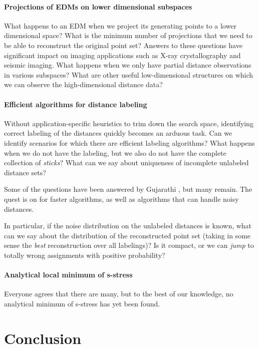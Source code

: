 \documentclass[10pt,double]{IEEEtran}
\newcommand{\rev}[1]{{#1}}
\begin{document}
\paragraph{Projections of EDMs on lower dimensional subspaces} What happens
to an EDM when we project its generating points to a lower dimensional space?
What is the minimum number of projections that we need to be able to
reconstruct the original point set? Answers to these questions have
significant impact on imaging applications such as X-ray crystallography and
seismic imaging. What happens when we only have partial distance observations
in various subspaces? What are other useful low-dimensional structures on
which we can observe the high-dimensional distance data?


\paragraph{Efficient algorithms for distance labeling} Without
application-specific heuristics to trim down the search space, identifying
correct labeling of the distances quickly becomes an arduous task. Can we
identify scenarios for which there are efficient labeling algorithms? What
happens when we do not have the labeling, but we also do not have the complete
collection of \emph{sticks}? What can we say about uniqueness of incomplete
unlabeled distance sets? \rev{Some of the questions have been answered by
Gujarathi \cite{Gujarathi:2014cz}, but many remain. The quest is on for faster
algorithms, as well as algorithms that can handle noisy distances.

In particular, if the noise distribution on the unlabeled distances is known,
what can we say about the distribution of the reconstructed point set (taking
in some sense the \emph{best} reconstruction over all labelings)? Is it
compact, or we can \emph{jump} to totally wrong assignments with positive
probability?}


\paragraph{Analytical local minimum of s-stress} Everyone agrees that there
are many, but to the best of our knowledge, no analytical minimum of s-stress
has yet been found.



\section{Conclusion}
\end{document}
